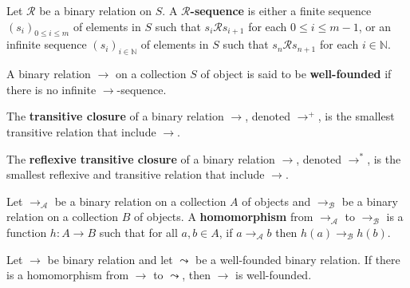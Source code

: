   \begin{definition}
    \label{def:binary_relation:sequence}
    Let \(\mathcal{R}\) be a binary relation on $S$.
    A \textbf{\( \mathcal{R} \)-sequence} is either a finite sequence \( \left( s_i \right)_{0 \leq i \leq m} \) of elements in $S$ such that \(s_i \mathcal{R} s_{i+1}\) for each \( 0 \leq i \leq m-1\), or an infinite sequence \((s_i)_{i \in \mathbb{N}}\) of elements in $S$ such that \(s_n \mathcal{R} s_{n+1}\) for each \(i \in \mathbb{N}\).
\end{definition}

\begin{definition}
    \label{def:binary_relation:well_founded}
    A binary relation $\to$ on a collection $S$ of object is said to be \textbf{well-founded} if there is no infinite $\to$-sequence. 
\end{definition}

\begin{definition}
    \label{def:binary_relation:transitive_closure}
    The \textbf{transitive closure} of a binary relation $\to$, denoted $\to^+$, is the smallest transitive relation that include \( \to \).
  \end{definition}
  
  \begin{definition}
    \label{def:binary_relation:reflexive_transitive_closure}
    The \textbf{reflexive transitive closure} of a binary relation $\to$, denoted $\to^*$, is the smallest reflexive and transitive relation that include \( \to \).
  \end{definition}

  \begin{definition}
    \label{def:binary_relation:homomorphism}
    Let $\to_\mathcal{A}$ be a binary relation on a collection $A$ of objects and $\to_\mathcal{B}$ be a binary relation on a collection $B$ of objects. A \textbf{homomorphism} from $\to_\mathcal{A}$ to $\to_\mathcal{B}$ is a function \( h: A \to B \) such that for all \( a, b \in A \), if \( a \to_\mathcal{A} b \) then \( h(a) \to_\mathcal{B} h(b) \).
  \end{definition}
  
\begin{proposition}
  \label{prop:binary_relation:proving_well_foundedness}
  Let \(\to\) be binary relation and let $\leadsto$ be a well-founded binary relation. If there is a homomorphism from \(\to\) to \(\leadsto\), then \(\to\) is well-founded.
\end{proposition}
  
